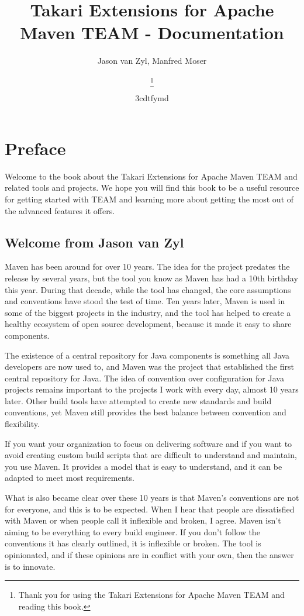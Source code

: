 \documentclass[a4paper]{book}
\title{Takari Extensions for Apache Maven TEAM - Documentation}
\author{Jason van Zyl, Manfred Moser}
\title{\textbf{\savedtitle}}
\author{\textbf{\savedauthor}\thanks{Thank you for using the Takari Extensions for Apache Maven TEAM and reading this book.}}
\date{\w3cdtfymd}
\makeatletter
\let\savedtitle=\@title
\newcounter{tab}[chapter]
\newcommand{\chap}[1]{\newpage\thispagestyle{empty}\chapter{#1}\label{chap:\thechapter}}
\makeatother
\begin{document}
\frontmatter
\maketitle
\thispagestyle{empty}
\setcounter{tocdepth}{4}
\tableofcontents\newpage\thispagestyle{empty}

\mainmatter
\fancyhf{}
\fancyhead[LE]{{\small\leftmark}}
\fancyhead[RO]{{\small\rightmark}}
\fancyhead[RE,LO]{{\small\textbf{\savedtitle}}}
\fancyfoot[LE,RO]{\small\textbf\thepage}
\pagestyle{fancy}

\chap{Preface}\label{preface}

Welcome to the book about the Takari Extensions for Apache Maven TEAM and related tools and projects. We hope you will find this book to be a useful resource for getting started with TEAM and learning more about getting the most out of the advanced features it offers.

\section{Welcome from Jason van Zyl}\label{welcome-from-jason-van-zyl}

Maven has been around for over 10 years. The idea for the project predates the release by several years, but the tool you know as Maven has had a 10th birthday this year. During that decade, while the tool has changed, the core assumptions and conventions have stood the test of time. Ten years later, Maven is used in some of the biggest projects in the industry, and the tool has helped to create a healthy ecosystem of open source development, because it made it easy to share components.

The existence of a central repository for Java components is something all Java developers are now used to, and Maven was the project that established the first central repository for Java. The idea of convention over configuration for Java projects remains important to the projects I work with every day, almost 10 years later. Other build tools have attempted to create new standards and build conventions, yet Maven still provides the best balance between convention and flexibility.

If you want your organization to focus on delivering software and if you want to avoid creating custom build scripts that are difficult to understand and maintain, you use Maven. It provides a model that is easy to understand, and it can be adapted to meet most requirements.

What is also became clear over these 10 years is that Maven's conventions are not for everyone, and this is to be expected. When I hear that people are dissatisfied with Maven or when people call it inflexible and broken, I agree. Maven isn't aiming to be everything to every build engineer. If you don't follow the conventions it has clearly outlined, it is inflexible or broken. The tool is opinionated, and if these opinions are in conflict with your own, then the answer is to innovate.
\end{document}
